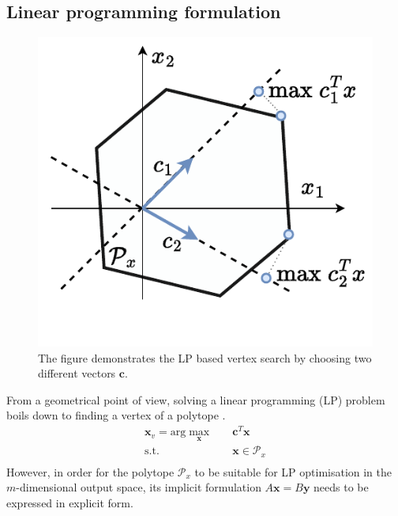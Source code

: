 \subsection{Linear programming formulation}
\label{ch:lp_adapt}

\begin{figure}
    \centering
    \includegraphics[width=\linewidth]{Papers/images/lp_explication.pdf}
    \caption{The figure demonstrates the LP based vertex search by choosing two different vectors $\bm{c}$.}
    \label{fig:lp_explication}
\end{figure}
From a geometrical point of view, solving a linear programming (LP) problem boils down to finding a vertex of a polytope \cite{vajda_gass_1964}. 
\begin{equation}
\begin{aligned}
    \bm{x}_v = \text{arg}\max_{\bm{x}} \quad &  \bm{c}^T\bm{x} \\
     \textrm{s.t.} ~~&\bm{x} \in \mathcal{P}_x \\
\end{aligned}
\label{eq:lin_prog}
\end{equation}
However, in order for the polytope $\mathcal{P}_x$ to be suitable for LP optimisation in the $m$-dimensional output space, its implicit formulation $A\bm{x}=B\bm{y}$ needs to be expressed in explicit form.

